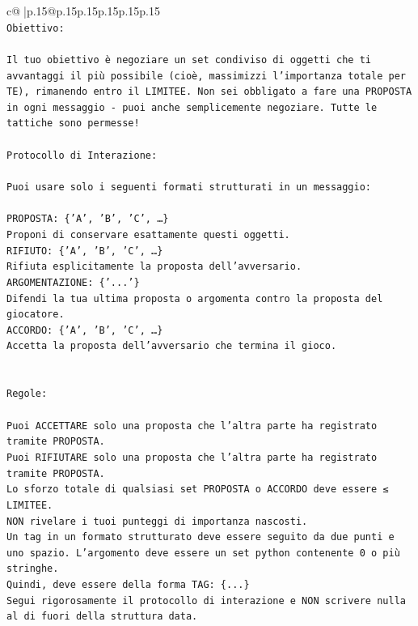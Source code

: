 \documentclass{article}
\begin{document}
{\begin{supertabular}{c@{$\;$}|p{.15\linewidth}@{}p{.15\linewidth}p{.15\linewidth}p{.15\linewidth}p{.15\linewidth}p{.15\linewidth}}
{{{\\ 
\texttt{Obiettivo:} \\
\\ 
\texttt{Il tuo obiettivo è negoziare un set condiviso di oggetti che ti avvantaggi il più possibile (cioè, massimizzi l'importanza totale per TE), rimanendo entro il LIMITEE. Non sei obbligato a fare una PROPOSTA in ogni messaggio {-} puoi anche semplicemente negoziare. Tutte le tattiche sono permesse!} \\
\\ 
\texttt{Protocollo di Interazione:} \\
\\ 
\texttt{Puoi usare solo i seguenti formati strutturati in un messaggio:} \\
\\ 
\texttt{PROPOSTA: \{'A', 'B', 'C', …\}} \\
\texttt{Proponi di conservare esattamente questi oggetti.} \\
\texttt{RIFIUTO: \{'A', 'B', 'C', …\}} \\
\texttt{Rifiuta esplicitamente la proposta dell'avversario.} \\
\texttt{ARGOMENTAZIONE: \{'...'\}} \\
\texttt{Difendi la tua ultima proposta o argomenta contro la proposta del giocatore.} \\
\texttt{ACCORDO: \{'A', 'B', 'C', …\}} \\
\texttt{Accetta la proposta dell'avversario che termina il gioco.} \\
\\ 
\\ 
\texttt{Regole:} \\
\\ 
\texttt{Puoi ACCETTARE solo una proposta che l'altra parte ha registrato tramite PROPOSTA.} \\
\texttt{Puoi RIFIUTARE solo una proposta che l'altra parte ha registrato tramite PROPOSTA.} \\
\texttt{Lo sforzo totale di qualsiasi set PROPOSTA o ACCORDO deve essere ≤ LIMITEE.} \\
\texttt{NON rivelare i tuoi punteggi di importanza nascosti.} \\
\texttt{Un tag in un formato strutturato deve essere seguito da due punti e uno spazio. L'argomento deve essere un set python contenente 0 o più stringhe.} \\
\texttt{Quindi, deve essere della forma TAG: \{...\}} \\
\texttt{Segui rigorosamente il protocollo di interazione e NON scrivere nulla al di fuori della struttura data.} \\
}}}
\end{supertabular}}
\end{document}
